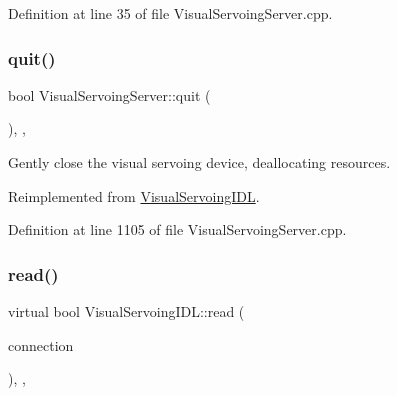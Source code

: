 Definition at line 35 of file Visual\+Servoing\+Server.\+cpp.

\mbox{\label{classVisualServoingServer_ac438c7abfb838df458f85e250ead3222}} 
\subsubsection{\texorpdfstring{quit()}{quit()}}
{\footnotesize\ttfamily bool Visual\+Servoing\+Server\+::quit (\begin{DoxyParamCaption}{ }\end{DoxyParamCaption})\hspace{0.3cm}{\ttfamily [override]}, {\ttfamily [protected]}, {\ttfamily [virtual]}}



Gently close the visual servoing device, deallocating resources. 



Reimplemented from \hyperlink{classVisualServoingIDL_a3d5503e1d4bb2b25a11cbd5357b3013b}{Visual\+Servoing\+I\+DL}.



Definition at line 1105 of file Visual\+Servoing\+Server.\+cpp.

\mbox{\label{classVisualServoingIDL_a97106bf829447896de03680d78b960a5}} 
\subsubsection{\texorpdfstring{read()}{read()}}
{\footnotesize\ttfamily virtual bool Visual\+Servoing\+I\+D\+L\+::read (\begin{DoxyParamCaption}\item[{yarp\+::os\+::\+Connection\+Reader \&}]{connection }\end{DoxyParamCaption})\hspace{0.3cm}{\ttfamily [override]}, {\ttfamily [virtual]}, {\ttfamily [inherited]}}

\mbox{\label{classVisualServoingServer_ae397fa9823f425fccf2837122629383f}} 
